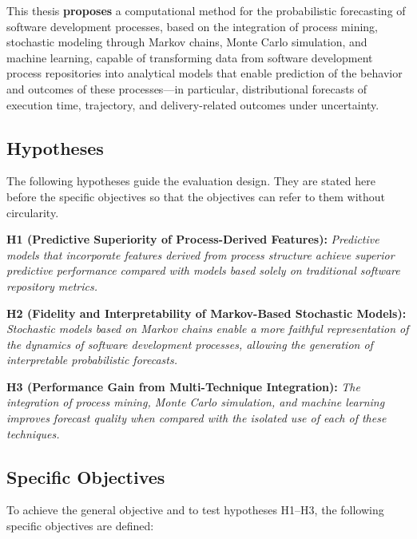 This thesis \textbf{proposes} a computational method for the probabilistic
forecasting of software development processes, based on the integration of
process mining, stochastic modeling through Markov chains, Monte Carlo
simulation, and machine learning, capable of transforming data from
software development process repositories into analytical models that
enable prediction of the behavior and outcomes of these processes---in
particular, distributional forecasts of execution time, trajectory, and
delivery-related outcomes under uncertainty.

\subsection{Hypotheses}

The following hypotheses guide the evaluation design.
They are stated here before the specific objectives so that the
objectives can refer to them without circularity.

\textbf{H1 (Predictive Superiority of Process-Derived Features):}
\emph{Predictive models that incorporate features derived from process
structure achieve superior predictive performance compared with models
based solely on traditional software repository metrics.}

\textbf{H2 (Fidelity and Interpretability of Markov-Based Stochastic Models):}
\emph{Stochastic models based on Markov chains enable a more faithful
representation of the dynamics of software development processes,
allowing the generation of interpretable probabilistic forecasts.}

\textbf{H3 (Performance Gain from Multi-Technique Integration):}
\emph{The integration of process mining, Monte Carlo simulation, and
machine learning improves forecast quality when compared with the
isolated use of each of these techniques.}

\subsection{Specific Objectives}

To achieve the general objective and to test hypotheses H1--H3, the
following specific objectives are defined:

